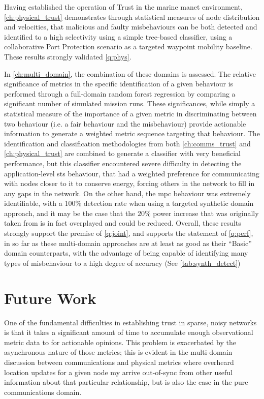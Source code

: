Having established the operation of Trust in the marine \gls{manet} environment, \autoref{ch:physical_trust} demonstrates through statistical measures of node distribution and velocities, that malicious and faulty misbehaviours can be both detected and identified to a high selectivity using a simple tree-based classifier, using a collaborative Port Protection scenario as a targeted waypoint mobility baseline. 
These results strongly validated \autoref{q:phys}.

In \autoref{ch:multi_domain}, the combination of these domains is assessed.
The relative significance of metrics in the specific identification of a given behaviour is performed through a full-domain random forest regression by comparing a significant number of simulated mission runs.
These significances, while simply a statistical measure of the importance of a given metric in discriminating between two behaviour (i.e. a fair behaviour and the misbehaviour) provide actionable information to generate a weighted metric sequence targeting that behaviour.
The identification and classification methodologies from both \autoref{ch:comms_trust} and \autoref{ch:physical_trust} are combined to generate a classifier with very beneficial performance, but this classifier encountered severe difficulty in detecting the application-level \gls{sts} behaviour, that had a weighted preference for communicating with nodes closer to it to conserve energy, forcing others in the network to fill in any gaps in the network.
On the other hand, the \gls{mpc} behaviour was extremely identifiable, with a 100\% detection rate when using a targeted synthetic domain approach, and it may be the case that the $20\%$ power increase that was originally taken from \citet{Guo11} is in fact overplayed and could be reduced.
Overall, these results strongly support the premise of \autoref{q:joint}, and supports the statement of \autoref{q:perf}, in so far as these multi-domain approaches are at least as good as their ``Basic'' domain counterparts, with the advantage of being capable of identifying many types of misbehaviour to a high degree of accuracy (See \autoref{tab:synth_detect})




\section{Future Work}
One of the fundamental difficulties in establishing trust in sparse, noisy networks is that it takes a significant amount of time to accumulate enough observational metric data to for actionable opinions.
This problem is exacerbated by the asynchronous nature of those metrics; this is evident in the multi-domain discussion between communications and physical metrics where overheard location updates for a given node my arrive out-of-sync from other useful information about that particular relationship, but is also the case in the pure communications domain.


